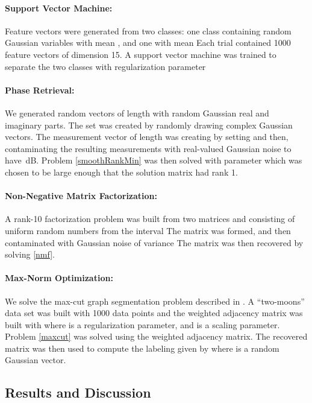 \documentclass{amsart}
\theoremstyle{definition}
\begin{document}
\paragraph{\textbf{Support Vector Machine:}}
 Feature vectors were generated from two classes: one class containing random Gaussian variables with mean , and one with mean   Each trial contained 1000 feature vectors of dimension 15.  A support vector machine was trained to separate the two classes with regularization parameter   
 
 
\paragraph{\textbf{Phase Retrieval:}}

We generated random vectors of length  with random Gaussian real and imaginary parts.  The set  was created by randomly drawing complex Gaussian vectors.  The measurement vector  of length  was creating by setting  and then, contaminating the resulting measurements with real-valued Gaussian noise to have \,dB.  Problem \eqref{smoothRankMin} was then solved with parameter  which was chosen to be large enough that the solution matrix had rank 1.

\paragraph{\textbf{Non-Negative Matrix Factorization:}}
 A rank-10 factorization problem was built from two matrices  and  consisting of uniform random numbers from the interval   The matrix  was formed, and then contaminated with Gaussian noise of variance   The matrix was then recovered by solving \eqref{nmf}.
 
 \paragraph{\textbf{Max-Norm Optimization:}}
 We solve the max-cut graph segmentation problem described in \cite{LRSST10}.  A ``two-moons'' data set was built with 1000 data points  and the weighted adjacency matrix  was built with  where  is a regularization parameter, and  is a scaling parameter.  Problem \eqref{maxcut} was solved using the weighted adjacency matrix.  The recovered matrix  was then used to compute the labeling given by  where  is a random Gaussian vector.    

\subsection{Results and Discussion}
\end{document}
